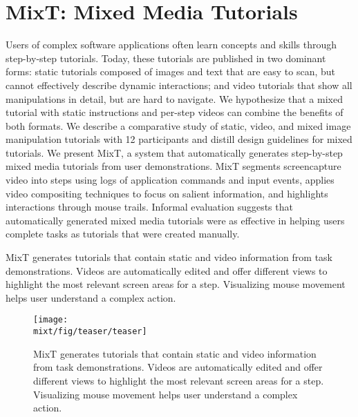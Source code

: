 \chapter{MixT: Mixed Media Tutorials}

Users of complex software applications often learn concepts and skills through step-by-step tutorials. Today, these tutorials are published in two dominant forms: static tutorials composed of images and text that are easy to scan, but cannot effectively describe dynamic interactions; and video tutorials that show all manipulations in detail, but are hard to navigate. We hypothesize that a mixed tutorial with static instructions and per-step videos can combine the benefits of both formats. We describe a comparative study of static, video, and mixed image manipulation tutorials with 12 participants and distill design guidelines for mixed tutorials. We present MixT, a system that automatically generates step-by-step mixed media tutorials from user demonstrations. MixT segments screencapture video into steps using logs of application commands and input events, applies video compositing techniques to focus on salient information, and highlights interactions through mouse trails. Informal evaluation suggests that automatically generated mixed media tutorials were as effective in helping users complete tasks as tutorials that were created manually.

MixT generates tutorials that contain static and video information from task demonstrations. Videos are automatically edited and offer different views to highlight the most relevant screen areas for a step. Visualizing mouse movement helps user understand a complex action.

\begin{figure*}[t]
  \centering
  \texttt{[image: \\mixt/fig/teaser/teaser]}
  \caption{MixT generates tutorials that contain static and video information from task demonstrations. Videos are automatically edited and offer different views to highlight the most relevant screen areas for a step. Visualizing mouse movement helps user understand a complex action.}
  \label{fig:mixt_teaser}
\end{figure*}











